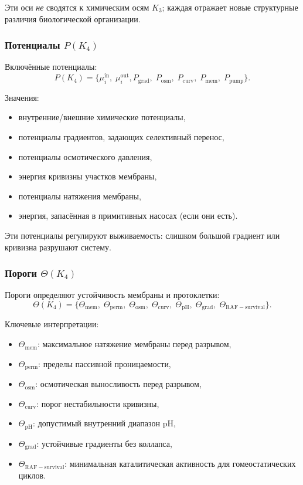 Эти оси \emph{не} сводятся к химическим осям $K_3$; каждая
отражает новые структурные различия биологической организации.

\subsubsection{Потенциалы \texorpdfstring{$P(K_4)$}{P(K_4)}}

Включённые потенциалы:
\[
P(K_4) =
\{ \mu_i^{\mathrm{in}},\; \mu_i^{\mathrm{out}},
   P_{\mathrm{grad}},\;
   P_{\mathrm{osm}},\;
   P_{\mathrm{curv}},\;
   P_{\mathrm{mem}},\;
   P_{\mathrm{pump}} \}.
\]

Значения:
\begin{itemize}
    \item внутренние/внешние химические потенциалы,
    \item потенциалы градиентов, задающих селективный перенос,
    \item потенциалы осмотического давления,
    \item энергия кривизны участков мембраны,
    \item потенциалы натяжения мембраны,
    \item энергия, запасённая в примитивных насосах (если они есть).
\end{itemize}

Эти потенциалы регулируют выживаемость: слишком большой градиент или
кривизна разрушают систему.

\subsubsection{Пороги \texorpdfstring{$\Theta(K_4)$}{\Theta(K_4)}}

Пороги определяют устойчивость мембраны и протоклетки:
\[
\Theta(K_4) =
\{\Theta_{\mathrm{mem}},\;
  \Theta_{\mathrm{perm}},\;
  \Theta_{\mathrm{osm}},\;
  \Theta_{\mathrm{curv}},\;
  \Theta_{\mathrm{pH}},\;
  \Theta_{\mathrm{grad}},\;
  \Theta_{\mathrm{RAF-survival}}\}.
\]

Ключевые интерпретации:
\begin{itemize}
    \item $\Theta_{\mathrm{mem}}$: максимальное натяжение мембраны перед
          разрывом,
    \item $\Theta_{\mathrm{perm}}$: пределы пассивной проницаемости,
    \item $\Theta_{\mathrm{osm}}$: осмотическая выносливость перед разрывом,
    \item $\Theta_{\mathrm{curv}}$: порог нестабильности кривизны,
    \item $\Theta_{\mathrm{pH}}$: допустимый внутренний диапазон pH,
    \item $\Theta_{\mathrm{grad}}$: устойчивые градиенты без коллапса,
    \item $\Theta_{\mathrm{RAF-survival}}$: минимальная каталитическая активность
          для гомеостатических циклов.
\end{itemize}

